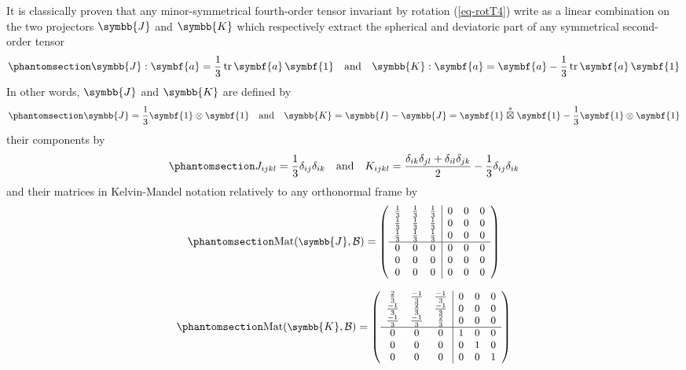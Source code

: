 \documentclass[
  a4paper,
  numbers=noendperiod,
  DIV=12]{scrreprt}
\newcommand{\uu}[1]{{\symbf{{#1}}}}
\newcommand{\uuuu}[1]{{\symbb{{#1}}}}
\newcommand{\sboxtimes}{\stackrel{s}{\boxtimes}}
\DeclareMathOperator{\Mat}{Mat}
\DeclareMathOperator{\tr}{tr}
\begin{document}
It is classically proven that any minor-symmetrical fourth-order tensor
invariant by rotation (\ref{eq-rotT4}) write as a linear combination on
the two projectors \(\uuuu{J}\) and \(\uuuu{K}\) which respectively
extract the spherical and deviatoric part of any symmetrical
second-order tensor
\begin{equation}\protect\phantomsection\label{eq-JKext}{
\uuuu{J}:\uu{a}=\frac{1}{3}\tr{\uu{a}}\,\uu{1}
\quad \textrm{and} \quad
\uuuu{K}:\uu{a}=\uu{a}-\frac{1}{3}\tr{\uu{a}}\,\uu{1}
}\end{equation} In other words, \(\uuuu{J}\) and \(\uuuu{K}\) are
defined by \begin{equation}\protect\phantomsection\label{eq-JK}{
\uuuu{J}=\frac{1}{3}\uu{1}\otimes\uu{1}
\quad \textrm{and} \quad
\uuuu{K}=\uuuu{I}-\uuuu{J}=\uu{1}\sboxtimes\uu{1}-\frac{1}{3}\uu{1}\otimes\uu{1}
}\end{equation} their components by
\begin{equation}\protect\phantomsection\label{eq-JKijkl}{
J_{ijkl}=\frac{1}{3}\delta_{ij}\delta_{ik}
\quad \textrm{and} \quad
K_{ijkl}=\frac{\delta_{ik}\delta_{jl}+\delta_{il}\delta_{jk}}{2}-\frac{1}{3}\delta_{ij}\delta_{ik}
}\end{equation} and their matrices in Kelvin-Mandel notation relatively
to any orthonormal frame by
\begin{equation}\protect\phantomsection\label{eq-matJ}{
\small
\Mat(\uuuu{J},\mathcal{B})=
   \left(
   \begin{array}{ccc|ccc}
   \frac{1}{3} & \frac{1}{3} & \frac{1}{3} & 0 & 0 & 0 \\
   \frac{1}{3} & \frac{1}{3} & \frac{1}{3} & 0 & 0 & 0 \\
   \frac{1}{3} & \frac{1}{3} & \frac{1}{3} & 0 & 0 & 0 \\
   \hline
   0 & 0 & 0 & 0 & 0 & 0 \\
   0 & 0 & 0 & 0 & 0 & 0 \\
   0 & 0 & 0 & 0 & 0 & 0 \\
   \end{array}
   \right)
}\end{equation}

\begin{equation}\protect\phantomsection\label{eq-matK}{
\small
\Mat(\uuuu{K},\mathcal{B})=
   \left(
   \begin{array}{ccc|ccc}
   \frac{2}{3} & \frac{-1}{3} & \frac{-1}{3} & 0 & 0 & 0 \\
   \frac{-1}{3} & \frac{2}{3} & \frac{-1}{3} & 0 & 0 & 0 \\
   \frac{-1}{3} & \frac{-1}{3} & \frac{2}{3} & 0 & 0 & 0 \\
   \hline
   0 & 0 & 0 & 1 & 0 & 0 \\
   0 & 0 & 0 & 0 & 1 & 0 \\
   0 & 0 & 0 & 0 & 0 & 1 \\
   \end{array}
   \right)
}\end{equation}
\end{document}
